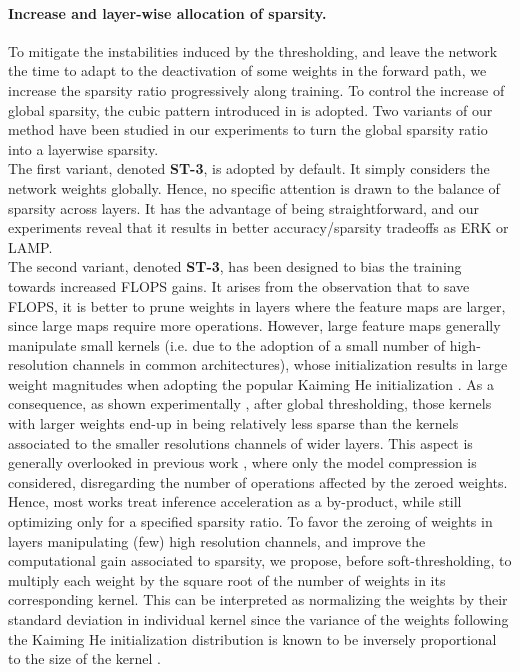 \documentclass[10pt,twocolumn,letterpaper]{article}
\begin{document}
\paragraph{Increase and layer-wise allocation of sparsity.}
To mitigate the instabilities induced by the thresholding, and leave the network the time to adapt to the deactivation of some weights in the forward path, we increase the sparsity ratio progressively along training. To control the increase of global sparsity, the cubic pattern introduced in \cite{Zhu2018} is adopted. Two variants of our method have been studied in our experiments to turn the global sparsity ratio into a layerwise sparsity.\\
The first variant, denoted {\bf ST-3}, is adopted by default. It simply considers the network weights globally. Hence, no specific attention is drawn to the balance of sparsity across layers. It has the advantage of being straightforward, and our experiments reveal that it results in better accuracy/sparsity tradeoffs as ERK or LAMP.\\
The second variant, denoted {\bf ST-3}, has been designed to bias the training towards increased FLOPS gains.
It arises from the observation that to save FLOPS, it is better to prune weights in layers where the feature maps are larger, since large maps require more operations. However, large feature maps generally manipulate small kernels (i.e. due to the adoption of a small number of high-resolution channels in common architectures), whose initialization results in large weight magnitudes when adopting the popular Kaiming He initialization \cite{He2015a}. As a consequence, as shown experimentally \cite{Evci2020}, after global thresholding, those kernels with larger weights end-up in being relatively less sparse than the kernels associated to the smaller resolutions channels of wider layers.
This aspect is generally overlooked in previous work \cite{Frankle2020,Frankle2019,Renda2020,Lee2021}, where only the model compression is considered, disregarding the number of operations affected by the zeroed weights. Hence, most works \cite{Kusupati2020,Zhou2021} treat inference acceleration as a by-product, while still optimizing only for a specified sparsity ratio. To favor the zeroing of weights in layers manipulating (few) high resolution channels, and improve the computational gain associated to sparsity, we propose, before soft-thresholding, to multiply each weight by the square root of the number of weights in its corresponding kernel. This can be interpreted as normalizing the weights by their standard deviation in individual kernel since the variance of the weights following the Kaiming He initialization distribution is known to be inversely proportional to the size of the kernel \cite{He2015a}.  
\end{document}
